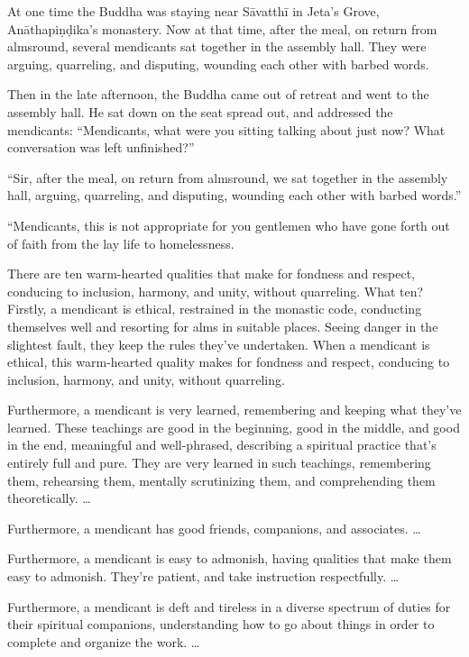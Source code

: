 \documentclass[12pt,openany]{book}%
\begin{document}
At one time the Buddha was staying near \textsanskrit{Sāvatthī} in Jeta’s Grove, \textsanskrit{Anāthapiṇḍika}’s monastery. Now at that time, after the meal, on return from almsround, several mendicants sat together in the assembly hall. They were arguing, quarreling, and disputing, wounding each other with barbed words. 

Then in the late afternoon, the Buddha came out of retreat and went to the assembly hall. He sat down on the seat spread out, and addressed the mendicants: “Mendicants, what were you sitting talking about just now? What conversation was left unfinished?” 

“Sir, after the meal, on return from almsround, we sat together in the assembly hall, arguing, quarreling, and disputing, wounding each other with barbed words.” 

“Mendicants, this is not appropriate for you gentlemen who have gone forth out of faith from the lay life to homelessness. 

There are ten warm-hearted qualities that make for fondness and respect, conducing to inclusion, harmony, and unity, without quarreling. What ten? Firstly, a mendicant is ethical, restrained in the monastic code, conducting themselves well and resorting for alms in suitable places. Seeing danger in the slightest fault, they keep the rules they’ve undertaken. When a mendicant is ethical, this warm-hearted quality makes for fondness and respect, conducing to inclusion, harmony, and unity, without quarreling. 

Furthermore, a mendicant is very learned, remembering and keeping what they’ve learned. These teachings are good in the beginning, good in the middle, and good in the end, meaningful and well-phrased, describing a spiritual practice that’s entirely full and pure. They are very learned in such teachings, remembering them, rehearsing them, mentally scrutinizing them, and comprehending them theoretically. … 

Furthermore, a mendicant has good friends, companions, and associates. … 

Furthermore, a mendicant is easy to admonish, having qualities that make them easy to admonish. They’re patient, and take instruction respectfully. … 

Furthermore, a mendicant is deft and tireless in a diverse spectrum of duties for their spiritual companions, understanding how to go about things in order to complete and organize the work. … 
\end{document}
